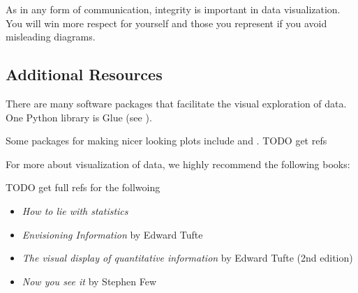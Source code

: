 As in any form of communication, integrity is important in data visualization. 
You will win more respect for yourself and those you represent if you avoid misleading diagrams.


\subsection*{Additional Resources}

There are many software packages that facilitate the visual exploration of data. 
One Python library is Glue (see \cite{glue}).

Some packages for making nicer looking plots include  and .  TODO get refs

For more about visualization of data, we highly recommend the following books:

TODO get full refs for the follwoing

\begin{itemize}
\item \emph{How to lie with statistics}
\item \emph{Envisioning Information} by Edward Tufte
\item \emph{The visual display of quantitative information} by Edward Tufte (2nd edition)
\item \emph{Now you see it} by Stephen Few
\end{itemize}



\printbibliography